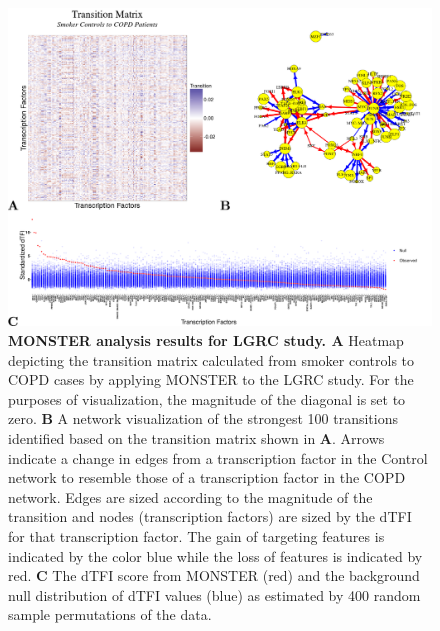 \begin{figure}
\includegraphics[width=1\linewidth]{figures/figure2LGRC}
\caption{\textbf{MONSTER analysis results for LGRC study. A } Heatmap depicting the transition matrix calculated from smoker controls to COPD cases by applying MONSTER to the LGRC study. For the purposes of visualization, the magnitude of the diagonal is set to zero. \textbf{B} A network visualization of the strongest 100 transitions identified based on the transition matrix shown in \textbf{A}. Arrows indicate a change in edges from a transcription factor in the Control network to resemble those of a transcription factor in the COPD network. Edges are sized according to the magnitude of the transition and nodes (transcription factors) are sized by the dTFI for that transcription factor. The gain of targeting features is indicated by the color blue while the loss of features is indicated by red. \textbf{C} The dTFI score from MONSTER (red) and the background null distribution of dTFI values (blue) as estimated by 400 random sample permutations of the data.}
\label{fig:figure2LGRC}
\end{figure}

